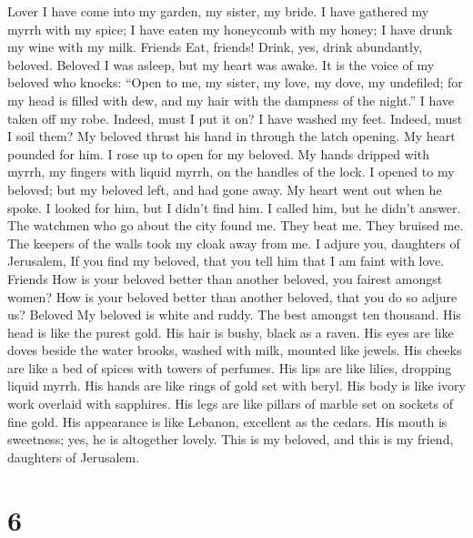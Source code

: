 Lover  I have come into my garden, my sister, my bride. I
have gathered my myrrh with my spice; I have eaten my honeycomb with my
honey; I have drunk my wine with my milk. Friends Eat, friends! Drink,
yes, drink abundantly, beloved. Beloved  I was asleep, but
my heart was awake. It is the voice of my beloved who knocks: ``Open to
me, my sister, my love, my dove, my undefiled; for my head is filled
with dew, and my hair with the dampness of the night.''  I
have taken off my robe. Indeed, must I put it on? I have washed my feet.
Indeed, must I soil them?  My beloved thrust his hand in
through the latch opening. My heart pounded for him.  I rose
up to open for my beloved. My hands dripped with myrrh, my fingers with
liquid myrrh, on the handles of the lock.  I opened to my
beloved; but my beloved left, and had gone away. My heart went out when
he spoke. I looked for him, but I didn't find him. I called him, but he
didn't answer.  The watchmen who go about the city found me.
They beat me. They bruised me. The keepers of the walls took my cloak
away from me.  I adjure you, daughters of Jerusalem, If you
find my beloved, that you tell him that I am faint with love. Friends
 How is your beloved better than another beloved, you
fairest amongst women? How is your beloved better than another beloved,
that you do so adjure us? Beloved  My beloved is white and
ruddy. The best amongst ten thousand.  His head is like the
purest gold. His hair is bushy, black as a raven.  His eyes
are like doves beside the water brooks, washed with milk, mounted like
jewels.  His cheeks are like a bed of spices with towers of
perfumes. His lips are like lilies, dropping liquid myrrh. 
His hands are like rings of gold set with beryl. His body is like ivory
work overlaid with sapphires.  His legs are like pillars of
marble set on sockets of fine gold. His appearance is like Lebanon,
excellent as the cedars.  His mouth is sweetness; yes, he
is altogether lovely. This is my beloved, and this is my friend,
daughters of Jerusalem.

\hypertarget{section-5}{%
\section{6}\label{section-5}}

